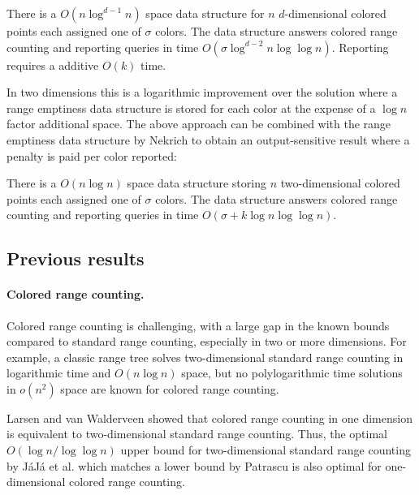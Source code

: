 \begin{corollary}\label{thm:col-dD}
    There is a $O(n \log ^{d-1} n)$ space data structure for $n$ $d$-dimensional colored points each assigned one of $\sigma$ colors. The data structure answers colored range counting and reporting queries in time $O(\sigma \log ^{d-2} n \log \log n)$. Reporting requires a additive $O(k)$ time.
\end{corollary}

In two dimensions this is a logarithmic improvement over the solution where a range emptiness data structure is stored for each color at the expense of a $\log n$ factor additional space. The above approach can be combined with the range emptiness data structure by Nekrich \cite{nekrich2009orthogonal} to obtain an output-sensitive result where a penalty is paid per color reported:

\begin{corollary}\label{thm:col-2D}
    There is a $O(n \log n)$ space data structure storing $n$ two-dimensional colored points each assigned one of $\sigma$ colors. The data structure answers colored range counting and reporting queries in time $O(\sigma + k \log n \log \log n)$.
\end{corollary}

\subsection{Previous results}
\label{sub:previous-results}
\paragraph*{Colored range counting.}
%
Colored range counting is challenging, with a large gap in the known bounds compared to standard range counting, especially in two or more dimensions. For example, a classic range tree solves two-dimensional standard range counting in logarithmic time and $O(n \log n)$ space, but no polylogarithmic time solutions in $o(n^2)$ space are known for colored range counting.

Larsen and van Walderveen \cite{larsen2013near, gupta1995further} showed that colored range counting in one dimension is equivalent to two-dimensional standard range counting. Thus, the optimal $O(\log n / \log \log n)$ upper bound for two-dimensional standard range counting by J{\'a}J{\'a} et al. \cite{jaja2005space} which matches a lower bound by Patrascu \cite{patrascu2007lower} is also optimal for one-dimensional colored range counting.

